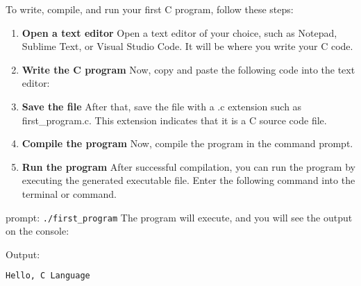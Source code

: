 To write, compile, and run your first C program, follow these steps:
\begin{enumerate}
	\item \textbf{Open a text editor} Open a text editor of your choice, such as Notepad, Sublime Text, or Visual Studio Code. It will be where you write your C code.
	\item \textbf{Write the C program} Now, copy and paste the following code into the text editor:
	
	\item \textbf{Save the file} After that, save the file with a .c extension such as first\_program.c. This extension indicates that it is a C source code file.
	\item \textbf{Compile the program} Now, compile the program in the command prompt.
	\item \textbf{Run the program} After successful compilation, you can run the program by executing the generated executable file. Enter the following command into the terminal or command.
\end{enumerate}

prompt:
\texttt{./first\_program}
The program will execute, and you will see the output on the console:

Output:
\begin{lstlisting}[caption=Bash, label={lst:listing-cpp}, language=bash, style=myStyle]
Hello, C Language
\end{lstlisting}